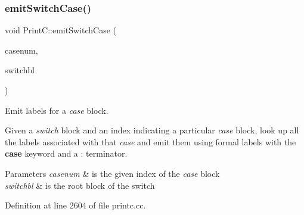 \subsubsection{\texorpdfstring{emitSwitchCase()}{emitSwitchCase()}}
{\footnotesize\ttfamily void Print\+C\+::emit\+Switch\+Case (\begin{DoxyParamCaption}\item[{int4}]{casenum,  }\item[{const \mbox{\hyperlink{class_block_switch}{Block\+Switch}} $\ast$}]{switchbl }\end{DoxyParamCaption})\hspace{0.3cm}{\ttfamily [protected]}}



Emit labels for a {\itshape case} block. 

Given a {\itshape switch} block and an index indicating a particular {\itshape case} block, look up all the labels associated with that {\itshape case} and emit them using formal labels with the {\bfseries{case}} keyword and a \textquotesingle{}\+:\textquotesingle{} terminator. 
\begin{DoxyParams}{Parameters}
{\em casenum} & is the given index of the {\itshape case} block \\
\hline
{\em switchbl} & is the root block of the switch \\
\hline
\end{DoxyParams}


Definition at line 2604 of file printc.\+cc.

